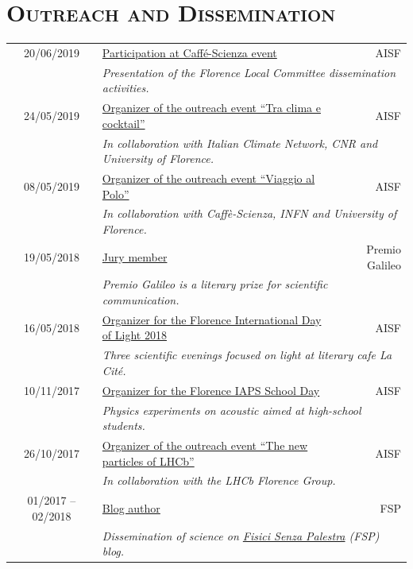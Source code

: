 \documentclass[a4paper, 11pt, notitlepage]{article}
\begin{document}
\vskip 9mm

\section*{\textsc{Outreach and Dissemination}}
\begin{tabular*}{\textwidth}{cl @{\extracolsep{\fill}} r}
    {\small 20/06/2019} & \underline{Participation at Caffé-Scienza event} & {\small AISF}\\
    & \multicolumn{2}{l}{\small \emph {Presentation of the Florence Local Committee dissemination activities.}}\\ [3mm]
        
    {\small 24/05/2019} & \ul{Organizer of the outreach event ``Tra clima e cocktail''} & {\small AISF}\\
    & \multicolumn{2}{l}{\small \emph {In collaboration with Italian Climate Network, CNR and University of Florence.}}\\ [3mm]
        
    {\small 08/05/2019} & \ul{Organizer of the outreach event ``Viaggio al Polo''} & {\small AISF}\\
    & \multicolumn{2}{l}{\small \emph {In collaboration with Caffè-Scienza, INFN and University of Florence.}}\\ [3mm]

    {\small 19/05/2018} & \ul{Jury member} & {\small Premio Galileo}\\
    & \multicolumn{2}{l}{\small \emph {Premio Galileo is a literary prize for scientific communication.}}\\ [3mm]

    {\small 16/05/2018} & \ul{Organizer for the Florence International Day of Light 2018} & {\small AISF}\\
    & \multicolumn{2}{l}{\small \emph {Three scientific evenings focused on light at literary cafe La Cité.}}\\ [3mm]

    {\small 10/11/2017} & \ul{Organizer for the Florence IAPS School Day} & {\small AISF}\\
    & \multicolumn{2}{l}{\small \emph {Physics experiments on acoustic aimed at high-school students.}}\\ [3mm]

    {\small 26/10/2017} & \ul{Organizer of the outreach event ``The new particles of LHCb''} & {\small AISF}\\
    & \multicolumn{2}{l}{\small \emph {In collaboration with the LHCb Florence Group.}}\\ [3mm]
    
    {\small 01/2017 -- 02/2018} & \ul{Blog author} & {\small FSP}\\
    & \multicolumn{2}{l}{\small \emph {Dissemination of science on \href{https://www.fisicisenzapalestra.com}{\textit{Fisici Senza Palestra}} (FSP) blog.}}
\end{tabular*}
\end{document}
